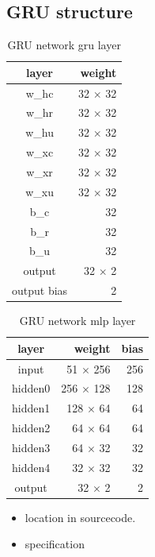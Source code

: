 \subsection{GRU structure}


\begin{table}[H]
\centering
\begin{tabular}{|c|r|}
\hline 
layer  & weight    \\ \hline \hline
w\_hc  & 32 $\times$ 32   \\
w\_hr  & 32 $\times$ 32   \\
w\_hu  & 32 $\times$ 32   \\
w\_xc  & 32 $\times$ 32   \\
w\_xr  & 32 $\times$ 32   \\
w\_xu  & 32 $\times$ 32   \\
b\_c  & 32   \\
b\_r  & 32   \\
b\_u  & 32   \\
output & 32 $\times$ 2   \\
output bias & 2   \\
\hline
\end{tabular} 
\caption{GRU network gru layer}
\label{tab:reward_gru_gru_network}
\end{table}

\begin{table}[H]
\centering
\begin{tabular}{|c|r|r|}
\hline 
layer  & weight   & bias \\ \hline \hline
input  & 51 $\times$ 256 & 256  \\
hidden0 & 256 $\times$ 128 & 128 \\
hidden1 & 128 $\times$ 64  & 64  \\
hidden2 & 64 $\times$ 64   & 64  \\
hidden3 & 64 $\times$ 32   & 32  \\
hidden4 & 32 $\times$ 32   & 32  \\
output & 32 $\times$ 2    & 2  \\
\hline
\end{tabular} 
\caption{GRU network mlp layer}
\label{tab:reward_gru_mlp_network}
\end{table}


\begin{itemize}
\item location in sourcecode.
\item specification
\end{itemize}

